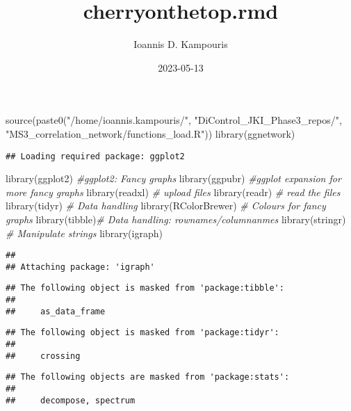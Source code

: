 \documentclass[
]{article}
\title{cherryonthetop.rmd}
\author{Ioannis D. Kampouris}
\date{2023-05-13}
\newenvironment{Shaded}{\begin{snugshade}}{\end{snugshade}}
\newcommand{\CommentTok}[1]{\textcolor[rgb]{0.56,0.35,0.01}{\textit{#1}}}
\newcommand{\FunctionTok}[1]{\textcolor[rgb]{0.00,0.00,0.00}{#1}}
\newcommand{\NormalTok}[1]{#1}
\newcommand{\StringTok}[1]{\textcolor[rgb]{0.31,0.60,0.02}{#1}}
\begin{document}
\maketitle

\begin{Shaded}
\begin{Highlighting}[]
\FunctionTok{source}\NormalTok{(}\FunctionTok{paste0}\NormalTok{(}\StringTok{"/home/ioannis.kampouris/"}\NormalTok{,}
\StringTok{"DiControl\_JKI\_Phase3\_repos/"}\NormalTok{,}
\StringTok{"MS3\_correlation\_network/functions\_load.R"}\NormalTok{))}
\FunctionTok{library}\NormalTok{(ggnetwork)}
\end{Highlighting}
\end{Shaded}

\begin{verbatim}
## Loading required package: ggplot2
\end{verbatim}

\begin{Shaded}
\begin{Highlighting}[]
\FunctionTok{library}\NormalTok{(ggplot2) }\CommentTok{\#ggplot2: Fancy graphs}
\FunctionTok{library}\NormalTok{(ggpubr) }\CommentTok{\#ggplot expansion for more fancy graphs}
\FunctionTok{library}\NormalTok{(readxl) }\CommentTok{\# upload files  }
\FunctionTok{library}\NormalTok{(readr) }\CommentTok{\# read the files}
\FunctionTok{library}\NormalTok{(tidyr) }\CommentTok{\# Data handling}
\FunctionTok{library}\NormalTok{(RColorBrewer) }\CommentTok{\# Colours for fancy graphs}
\FunctionTok{library}\NormalTok{(tibble)}\CommentTok{\# Data handling: rownames/columnanmes}
\FunctionTok{library}\NormalTok{(stringr) }\CommentTok{\# Manipulate strings}
\FunctionTok{library}\NormalTok{(igraph)}
\end{Highlighting}
\end{Shaded}

\begin{verbatim}
## 
## Attaching package: 'igraph'
\end{verbatim}

\begin{verbatim}
## The following object is masked from 'package:tibble':
## 
##     as_data_frame
\end{verbatim}

\begin{verbatim}
## The following object is masked from 'package:tidyr':
## 
##     crossing
\end{verbatim}

\begin{verbatim}
## The following objects are masked from 'package:stats':
## 
##     decompose, spectrum
\end{verbatim}
\end{document}
